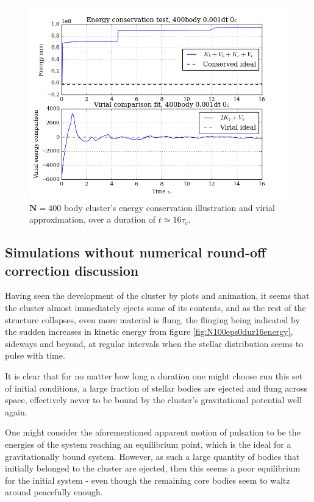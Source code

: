 \documentclass[11pt,a4paper,notitlepage,twocolumn]{article}
\begin{document}
\begin{figure}
[H]\center
\includegraphics[scale=0.35]{../figs/ClusterEnConsvVirial_400body_dt1_eps0_dur16.png}
\caption{$\mathbf{N} = 400$ body cluster's energy conservation illustration and virial approximation, over a duration of $t \simeq 16\tau_c$.}
\label{fig:N400eps0consVirial}
\end{figure}

\subsection{Simulations without numerical round-off correction discussion}
Having seen the development of the cluster by plots and animation, it seems that the cluster almost immediately ejects some of its contents, and as the rest of the structure collapses, even more material is flung, the flinging being indicated by the sudden increases in kinetic energy from figure \ref{fig:N100eps0dur16energy}, sideways and beyond, at regular intervals when the stellar distribution seems to pulse with time.

It is clear that for no matter how long a duration one might choose run this set of initial conditions, a large fraction of stellar bodies are ejected and flung across space, effectively never to be bound by the cluster's gravitational potential well again.

One might consider the aforementioned apparent motion of pulsation to be the energies of the system reaching an equilibrium point, which is the ideal for a gravitationally bound system. However, as such a large quantity of bodies that initially belonged to the cluster are ejected, then this seems a poor equilibrium for the initial system - even though the remaining core bodies seem to waltz around peacefully enough.
\end{document}
